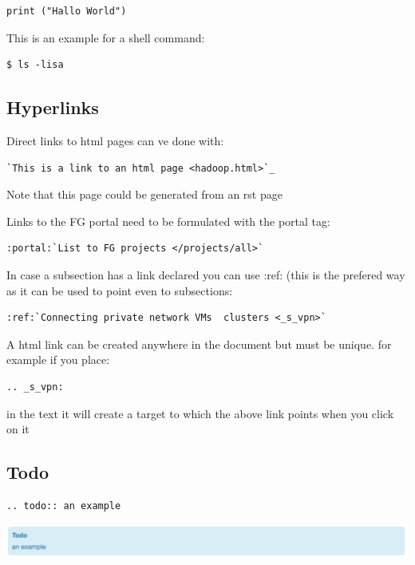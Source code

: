 \begin{verbatim}
print ("Hallo World")
\end{verbatim}

This is an example for a shell command:

\begin{verbatim}
$ ls -lisa
\end{verbatim}

\subsection{Hyperlinks}\label{hyperlinks}

Direct links to html pages can ve done with:

\begin{verbatim}
`This is a link to an html page <hadoop.html>`_
\end{verbatim}

Note that this page could be generated from an rst page

Links to the FG portal need to be formulated with the portal tag:

\begin{verbatim}
:portal:`List to FG projects </projects/all>`
\end{verbatim}

In case a subsection has a link declared you can use :ref: (this is the
prefered way as it can be used to point even to subsections:

\begin{verbatim}
:ref:`Connecting private network VMs  clusters <_s_vpn>` 
\end{verbatim}

A html link can be created anywhere in the document but must be unique.
for example if you place:

\begin{verbatim}
.. _s_vpn:
\end{verbatim}

in the text it will create a target to which the above link points when
you click on it

\subsection{Todo}\label{todo}

\begin{verbatim}
.. todo:: an example
\end{verbatim}

\includegraphics[width=\columnwidth]{../../images/todo.png}
